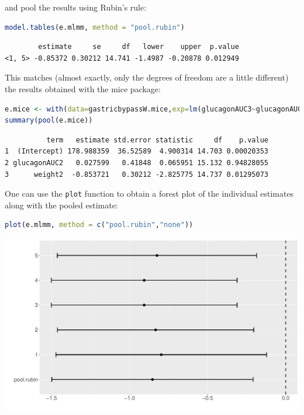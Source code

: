 \documentclass[12pt]{article}
\begin{document}
and pool the results using Rubin's rule:
\begin{lstlisting}[language=r,numbers=none]
model.tables(e.mlmm, method = "pool.rubin")
\end{lstlisting}

\label{}
\begin{verbatim}
        estimate     se     df   lower    upper  p.value
<1, 5> -0.85372 0.30212 14.741 -1.4987 -0.20878 0.012949
\end{verbatim}


\clearpage

This matches (almost exactly, only the degrees of freedom are a little
different) the results obtained with the mice package:
\begin{lstlisting}[language=r,numbers=none]
e.mice <- with(data=gastricbypassW.mice,exp=lm(glucagonAUC3~glucagonAUC2+weight2))
summary(pool(e.mice))
\end{lstlisting}

\label{}
\begin{verbatim}
          term   estimate std.error statistic     df    p.value
1  (Intercept) 178.988359  36.52589  4.900314 14.703 0.00020353
2 glucagonAUC2   0.027599   0.41848  0.065951 15.132 0.94828055
3      weight2  -0.853721   0.30212 -2.825775 14.737 0.01295073
\end{verbatim}


One can use the \texttt{plot} function to obtain a forest plot of the
individual estimates along with the pooled estimate:
\begin{lstlisting}[language=r,numbers=none]
plot(e.mlmm, method = c("pool.rubin","none"))
\end{lstlisting}

\begin{center}
\includegraphics[trim={0 0 0 0},width=1\textwidth]{./figures/forestplot.pdf}
\end{center}
\end{document}
